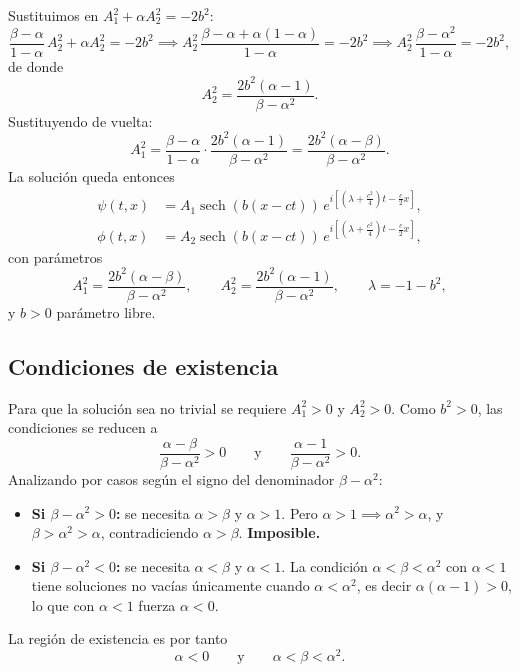 \documentclass[letterpaper,11pt]{exam}
\newcommand{\sech}{\operatorname{sech}}
\theoremstyle{plain}
\begin{document}
Sustituimos en $A_1^2 + \alpha A_2^2 = -2b^2$:
\begin{equation*}
    \frac{\beta-\alpha}{1-\alpha}\,A_2^2 + \alpha A_2^2 = -2b^2
    \implies
    A_2^2\,\frac{\beta - \alpha + \alpha(1-\alpha)}{1-\alpha} = -2b^2
    \implies
    A_2^2\,\frac{\beta - \alpha^2}{1 - \alpha} = -2b^2,
\end{equation*}
de donde
\begin{equation}\label{eq:s4A2}
    A_2^2 = \frac{2b^2(\alpha - 1)}{\beta - \alpha^2}.
\end{equation}
Sustituyendo de vuelta:
\begin{equation}\label{eq:s4A1}
    A_1^2 = \frac{\beta-\alpha}{1-\alpha} \cdot \frac{2b^2(\alpha-1)}{\beta-\alpha^2}
    = \frac{2b^2(\alpha - \beta)}{\beta - \alpha^2}.
\end{equation}
La solución queda entonces
\begin{align*}
    \psi(t,x) &= A_1\sech(b(x-ct))\,
                 e^{i\left[(\lambda+\frac{c^2}{4})t - \frac{c}{2}x\right]}, \\
    \phi(t,x) &= A_2\sech(b(x-ct))\,
                 e^{i\left[(\lambda+\frac{c^2}{4})t - \frac{c}{2}x\right]},
\end{align*}
con parámetros
\begin{equation*}
    A_1^2 = \frac{2b^2(\alpha-\beta)}{\beta-\alpha^2}, \qquad
    A_2^2 = \frac{2b^2(\alpha-1)}{\beta-\alpha^2}, \qquad
    \lambda = -1 - b^2,
\end{equation*}
y $b > 0$ parámetro libre.

\subsection*{Condiciones de existencia}

Para que la solución sea no trivial se requiere $A_1^2 > 0$ y $A_2^2 > 0$. 
Como $b^2 > 0$, las condiciones se reducen a
\begin{equation*}
    \frac{\alpha - \beta}{\beta - \alpha^2} > 0 
    \qquad \text{y} \qquad 
    \frac{\alpha - 1}{\beta - \alpha^2} > 0.
\end{equation*}
Analizando por casos según el signo del denominador $\beta - \alpha^2$:

\begin{itemize}
    \item \textbf{Si $\beta - \alpha^2 > 0$:} se necesita $\alpha > \beta$ y 
    $\alpha > 1$. Pero $\alpha > 1 \implies \alpha^2 > \alpha$, y $\beta > \alpha^2 > \alpha$, 
    contradiciendo $\alpha > \beta$. \textbf{Imposible.}
    
    \item \textbf{Si $\beta - \alpha^2 < 0$:} se necesita $\alpha < \beta$ y 
    $\alpha < 1$. La condición $\alpha < \beta < \alpha^2$ con $\alpha < 1$ 
    tiene soluciones no vacías únicamente cuando $\alpha < \alpha^2$, es decir 
    $\alpha(\alpha-1) > 0$, lo que con $\alpha < 1$ fuerza $\alpha < 0$.
\end{itemize}
La región de existencia es por tanto
\begin{equation*}
    \alpha < 0 \qquad \text{y} \qquad \alpha < \beta < \alpha^2.
\end{equation*}
\end{document}
